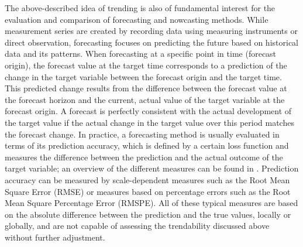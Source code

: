 The above-described idea of trending is also of fundamental interest for the evaluation and comparison of forecasting and nowcasting methods. While measurement series are created by recording data using measuring instruments or direct observation, forecasting focuses on predicting the future based on historical data and its patterns. When forecasting at a specific point in time (forecast origin), the forecast value at the target time corresponds to a prediction of the change in the target variable between the forecast origin and the target time. This predicted change results from the difference between the forecast value at the forecast horizon and the current, actual value of the target variable at the forecast origin. A forecast is perfectly consistent with the actual development of the target value if the actual change in the target value over this period matches the forecast change. In practice, a forecasting method is usually evaluated in terms of its prediction accuracy, which is defined by a certain loss function and measures the difference between the prediction and the actual outcome of the target variable; an overview of the different measures can be found in \cite{hyndman2006another}. Prediction accuracy can be measured by scale-dependent measures such as the Root Mean Square Error (RMSE) or measures based on percentage errors such as the Root Mean Square Percentage Error (RMSPE). All of these typical measures are based on the absolute difference between the prediction and the true values, locally or globally, and are not capable of assessing the trendability discussed above without further adjustment.

